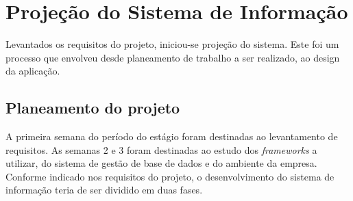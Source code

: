 \chapter{Projeção do Sistema de Informação} 
\label{cap:4}
Levantados os requisitos do projeto, iniciou-se projeção do sistema. Este foi um processo que envolveu desde planeamento de trabalho a ser realizado, ao design da aplicação.

\section{Planeamento do projeto}
A primeira semana do período do estágio foram destinadas ao levantamento de requisitos.
As semanas 2 e 3 foram destinadas ao estudo dos \textit{frameworks} a utilizar, do sistema de gestão de base de dados e do ambiente da empresa.
Conforme indicado nos requisitos do projeto, o desenvolvimento do sistema de informação teria de ser dividido em duas fases. 